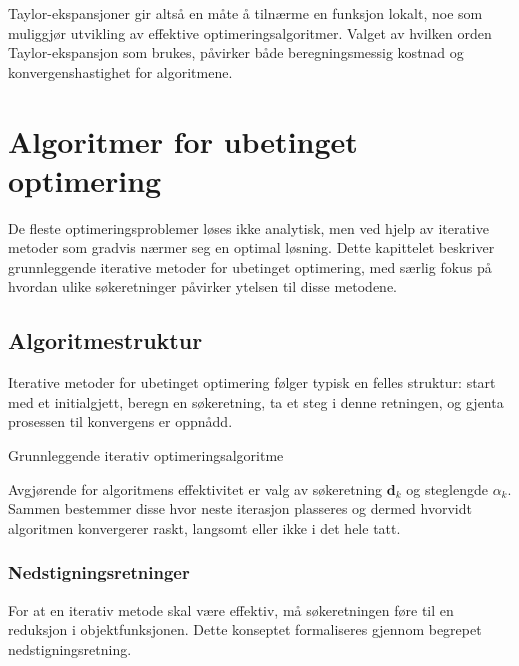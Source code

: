 Taylor-ekspansjoner gir altså en måte å tilnærme en funksjon lokalt, noe som muliggjør utvikling av effektive optimeringsalgoritmer. Valget av hvilken orden Taylor-ekspansjon som brukes, påvirker både beregningsmessig kostnad og konvergenshastighet for algoritmene.

\chapter{Algoritmer for ubetinget optimering}
\label{chap:iterative_methods}

De fleste optimeringsproblemer løses ikke analytisk, men ved hjelp av iterative metoder som gradvis nærmer seg en optimal løsning.
Dette kapittelet beskriver grunnleggende iterative metoder for ubetinget optimering, med særlig fokus på hvordan ulike søkeretninger påvirker ytelsen til disse metodene.

\section{Algoritmestruktur}
\label{sec:iterative_structure}

Iterative metoder for ubetinget optimering følger typisk en felles struktur: start med et initialgjett, beregn en søkeretning, ta et steg i denne retningen, og gjenta prosessen til konvergens er oppnådd.

\begin{algorithm}[H]
	\SetAlgoLined
	\caption{Grunnleggende iterativ optimeringsalgoritme}
	\label{alg:general_iterative}
\end{algorithm}

Avgjørende for algoritmens effektivitet er valg av søkeretning \(\symbf{d}_k\) og steglengde \(\alpha_k\). Sammen bestemmer disse hvor neste iterasjon plasseres og dermed hvorvidt algoritmen konvergerer raskt, langsomt eller ikke i det hele tatt.
\subsection{Nedstigningsretninger}
\label{sec:descent_directions}

For at en iterativ metode skal være effektiv, må søkeretningen føre til en reduksjon i objektfunksjonen. Dette konseptet formaliseres gjennom begrepet nedstigningsretning.

